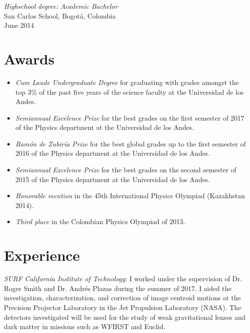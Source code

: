 \documentclass[line,margin]{res}
\begin{document}
\begin{resume}
{\sl Highschool degree: Academic Bachelor} \\
San Carlos School, Bogotá, Colombia \\
June 2014

\section{Awards}

\begin{itemize}

\item {\sl Cum Laude Undergraduate Degree} for graduating with grades amongst the top 3\% of the past five years of the science faculty at the Universidad de los Andes.  

\item {\sl Semiannual Excelence Prize} for the best grades on the first semester of 2017 of the Physics department at the Universidad de los Andes.

\item {\sl Ramón de Zubiría Prize} for the best global grades up to the first semester of 2016 of the Physics department at the Universidad de los Andes.

\item {\sl Semiannual Excelence Prize} for the best grades on the second semester of 2015 of the Physics department at the Universidad de los Andes.

\item {\sl Honorable mention} in the 45th International Physics Olympiad (Kazakhstan 2014).

\item {\sl Third place} in the Colombian Physics Olympiad of 2013.

\end{itemize}

\section{Experience}

{\sl SURF California Institute of Technology}: I worked under the supervision of Dr. Roger Smith and Dr. Andrés Plazas during the summer of 2017. I aided the investigation, characterization, and correction of image centroid motions at the Precision Projector Laboratory in the Jet Propulsion Laboratory (NASA). The detectors investigated will be used for the study of weak gravitational lenses and dark matter in missions such as WFIRST and Euclid.


\end{resume}
\end{document}
